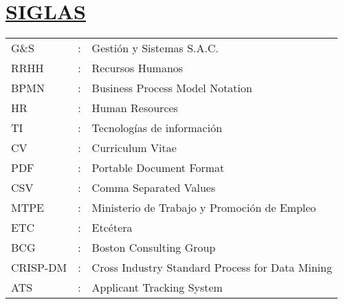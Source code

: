 \section*{\textbf{\underline{SIGLAS}}}

\begin{tabular}{L{2 cm}p{0.025 cm}p{11.7 cm}}
    G\&S     & : & Gestión y Sistemas S.A.C.                       \\
    RRHH     & : & Recursos Humanos                                \\
    BPMN     & : & Business Process Model Notation                 \\
    HR       & : & Human Resources                                 \\
    TI       & : & Tecnologías de información                      \\
    CV       & : & Curriculum Vitae                                \\
    PDF      & : & Portable Document Format                        \\
    CSV      & : & Comma Separated Values                          \\
    MTPE     & : & Ministerio de Trabajo y Promoción de Empleo     \\
    ETC      & : & Etcétera                                        \\
    BCG      & : & Boston Consulting Group                         \\
    CRISP-DM & : & Cross Industry Standard Process for Data Mining \\
    ATS      & : & Applicant Tracking System                       \\
\end{tabular}\\
